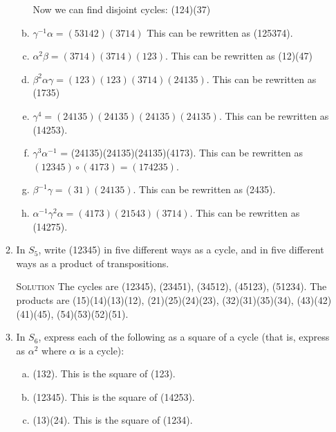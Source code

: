 \documentclass[twoside]{amsart}
\newcommand{\solution}{\textsc{Solution}\xspace}
\begin{document}
\begin{enumerate}[A.]
\begin{enumerate}[1]
\begin{enumerate}[(a)]
	    Now we can find disjoint cycles: (124)(37)

	    \item $\gamma^{-1}\alpha = (53142)(3714)$
	    This can be rewritten as (125374).

	    \item $\alpha^2\beta = (3714)(3714)(123)$.
	    This can be rewritten as (12)(47)

	    \item $\beta^2\alpha\gamma = (123)(123)(3714)(24135)$.
	    This can be rewritten as (1735)

	    \item $\gamma^4 = (24135)(24135)(24135)(24135)$.
	    This can be rewritten as (14253).

	    \item $\gamma^3\alpha^{-1}$ = (24135)(24135)(24135)(4173).
	    This can be rewritten as $(12345)\circ(4173) = (174235)$.

	    \item $\beta^{-1}\gamma = (31)(24135)$.
	    This can be rewritten as (2435).

	    \item $\alpha^{-1}\gamma^2\alpha = (4173)(21543)(3714)$.
	    This can be rewritten as (14275).
      \end{enumerate}

      \item In $S_5$, write (12345) in five different ways as a cycle, 
      and in five different ways as a product of transpositions.

      \solution The cycles are (12345), (23451), (34512), (45123),
      (51234). The products are (15)(14)(13)(12), (21)(25)(24)(23),
      (32)(31)(35)(34), (43)(42)(41)(45), (54)(53)(52)(51).

      \item In $S_6$, express each of the following as a square of a 
      cycle (that is, express as $\alpha^2$ where $\alpha$ is a cycle):

      \begin{enumerate}[(a)]
         \item (132). This is the square of (123).
	 \item (12345). This is the square of (14253).
	 \item (13)(24). This is the square of (1234).
      \end{enumerate}


   \end{enumerate}


\end{enumerate}
\end{document}
